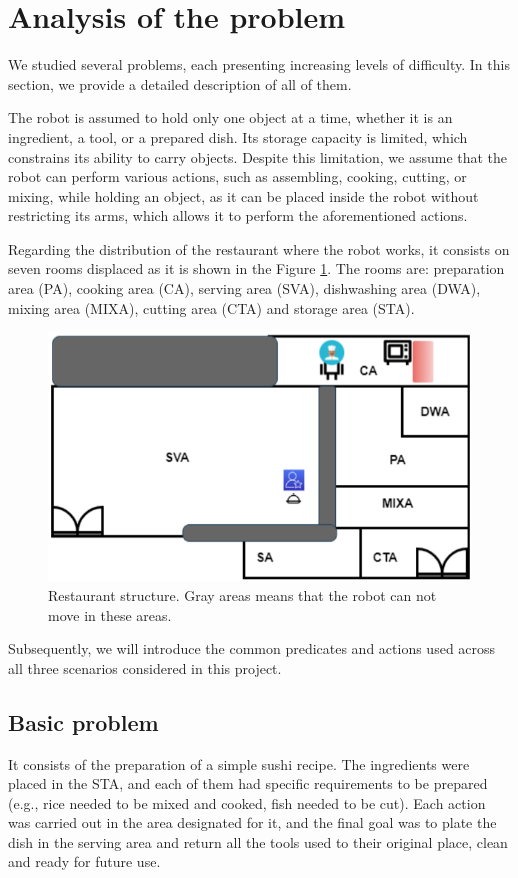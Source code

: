 \section{Analysis of the problem}

We studied several problems, each presenting increasing levels of difficulty. In this section, we provide a detailed description of 
all of them. 

The robot is assumed to hold only one object at a time, whether it is an ingredient, a tool, or a prepared dish. Its storage capacity is
 limited, which constrains its ability to carry objects. Despite this limitation, we assume that the robot can perform various actions,
  such as assembling, cooking, cutting, or mixing, while holding an object, as it can be placed inside the robot without restricting its
   arms, which allows it to perform the aforementioned actions.

Regarding the distribution of the restaurant where the robot works, it consists on seven rooms displaced as it is shown in the Figure 
\ref{fig:restaurant}. The rooms are: preparation area (PA), cooking area (CA), serving area (SVA), dishwashing area (DWA),
 mixing area (MIXA), cutting area (CTA) and storage area (STA).


\begin{figure}[h]
  \centering
  \includegraphics[width=0.5\linewidth]{restaurante.png}
  \caption{Restaurant structure. Gray areas means that the robot can not move in these areas.}
  \label{fig:restaurant}
\end{figure}

Subsequently, we will introduce the common predicates and actions used across all three scenarios considered in this project.

\subsection{Basic problem}\label{subsec:basic}
It consists of the preparation of a simple sushi recipe. The ingredients were placed in the STA, and each of them had specific 
requirements to be prepared (e.g., rice needed to be mixed and cooked, fish needed to be cut). Each action was carried out in the 
area designated for it, and the final goal was to plate the dish in the serving area and return all the tools used to their original
 place, clean and ready for future use.

